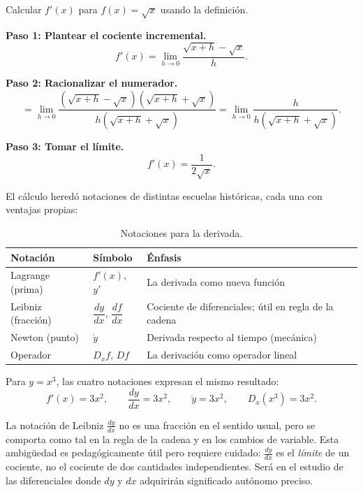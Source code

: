 \begin{example}
Calcular $f'(x)$ para $f(x) = \sqrt{x}$ usando la definición.

\begin{myproof}

\textbf{Paso 1: Plantear el cociente incremental.}
\[
f'(x) = \lim_{h\to 0}\frac{\sqrt{x+h}-\sqrt{x}}{h}.
\]

\textbf{Paso 2: Racionalizar el numerador.}
\[
= \lim_{h\to 0}\frac{(\sqrt{x+h}-\sqrt{x})(\sqrt{x+h}+\sqrt{x})}
  {h(\sqrt{x+h}+\sqrt{x})}
= \lim_{h\to 0}\frac{h}{h(\sqrt{x+h}+\sqrt{x})}.
\]

\textbf{Paso 3: Tomar el límite.}
\[
\boxed{f'(x) = \frac{1}{2\sqrt{x}}.}
\]
\end{myproof}
\end{example}

El cálculo heredó notaciones de distintas escuelas históricas, cada una
con ventajas propias:

\begin{table}[H]
\centering
\renewcommand{\arraystretch}{1.5}
\begin{tabular}{l l l}
\toprule
\textbf{Notación} & \textbf{Símbolo} & \textbf{Énfasis} \\
\midrule
Lagrange (prima) & $f'(x)$, $y'$
    & La derivada como nueva función \\
Leibniz (fracción) & $\dfrac{dy}{dx}$, $\dfrac{df}{dx}$
    & Cociente de diferenciales; útil en regla de la cadena \\
Newton (punto) & $\dot{y}$
    & Derivada respecto al tiempo (mecánica) \\
Operador & $D_x f$, $Df$
    & La derivación como operador lineal \\
\bottomrule
\end{tabular}
\caption{Notaciones para la derivada.}
\end{table}

Para $y = x^3$, las cuatro notaciones expresan el mismo resultado:
\[
f'(x) = 3x^2, \qquad \frac{dy}{dx} = 3x^2, \qquad
\dot{y} = 3x^2, \qquad D_x(x^3) = 3x^2.
\]

\begin{rem}
La notación de Leibniz $\frac{dy}{dx}$ no es una fracción en el sentido
usual, pero se comporta como tal en la regla de la cadena y en los cambios
de variable. Esta ambigüedad es pedagógicamente útil pero requiere cuidado:
$\frac{dy}{dx}$ es el \emph{límite} de un cociente, no el cociente de dos
cantidades independientes. Será en el estudio de las diferenciales donde
$dy$ y $dx$ adquirirán significado autónomo preciso.
\end{rem}


